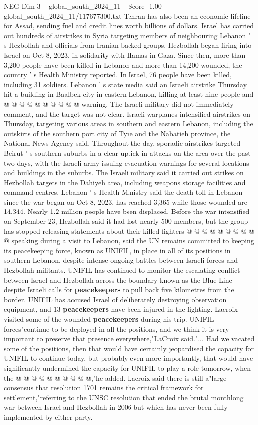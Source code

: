 \begin{textsample}{NEG Dim 3 – global\_south\_2024\_11 – Score -1.00 – global\_south\_2024\_11/117677300.txt}
Tehran has also been an economic lifeline for Assad, sending fuel and credit lines worth billions of dollars.
Israel has carried out hundreds of airstrikes in Syria targeting members of neighbouring Lebanon ' s Hezbollah and officials from Iranian-backed groups.
Hezbollah began firing into Israel on Oct 8, 2023, in solidarity with Hamas in Gaza.
Since then, more than 3,200 people have been killed in Lebanon and more than 14,200 wounded, the country ' s Health Ministry reported.
In Israel, 76 people have been killed, including 31 soldiers.
Lebanon ' s state media said an Israeli airstrike Thursday hit a building in Baalbek city in eastern Lebanon, killing at least nine people and @ @ @ @ @ @ @ @ @ @ warning.
The Israeli military did not immediately comment, and the target was not clear.
Israeli warplanes intensified airstrikes on Thursday, targeting various areas in southern and eastern Lebanon, including the outskirts of the southern port city of Tyre and the Nabatieh province, the National News Agency said.
Throughout the day, sporadic airstrikes targeted Beirut ' s southern suburbs in a clear uptick in attacks on the area over the past two days, with the Israeli army issuing evacuation warnings for several locations and buildings in the suburbs.
The Israeli military said it carried out strikes on Hezbollah targets in the Dahiyeh area, including weapons storage facilities and command centres.
Lebanon ' s Health Ministry said the death toll in Lebanon since the war began on Oct 8, 2023, has reached 3,365 while those wounded are 14,344.
Nearly 1.2 million people have been displaced.
Before the war intensified on September 23, Hezbollah said it had lost nearly 500 members, but the group has stopped releasing statements about their killed fighters @ @ @ @ @ @ @ @ @ @ speaking during a visit to Lebanon, said the UN remains committed to keeping its peacekeeping force, known as UNIFIL, in place in all of its positions in southern Lebanon, despite intense ongoing battles between Israeli forces and Hezbollah militants.
UNIFIL has continued to monitor the escalating conflict between Israel and Hezbollah across the boundary known as the Blue Line despite Israeli calls for \textbf{peacekeepers} to pull back five kilometres from the border.
UNIFIL has accused Israel of deliberately destroying observation equipment, and 13 \textbf{peacekeepers} have been injured in the fighting.
Lacroix visited some of the wounded \textbf{peacekeepers} during his trip.
UNIFIL forces"continue to be deployed in all the positions, and we think it is very important to preserve that presence everywhere,"LaCroix said."...
Had we vacated some of the positions, then that would have certainly jeopardised the capacity for UNIFIL to continue today, but probably even more importantly, that would have significantly undermined the capacity for UNIFIL to play a role tomorrow, when the @ @ @ @ @ @ @ @ @ @,"he added.
Lacroix said there is still a"large consensus that resolution 1701 remains the critical framework for settlement,"referring to the UNSC resolution that ended the brutal monthlong war between Israel and Hezbollah in 2006 but which has never been fully implemented by either party.

\end{textsample}
